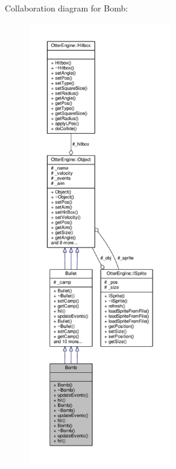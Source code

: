 Collaboration diagram for Bomb\+:\nopagebreak
\begin{figure}[H]
\begin{center}
\leavevmode
\includegraphics[height=550pt]{d9/d7e/class_bomb__coll__graph}
\end{center}
\end{figure}

